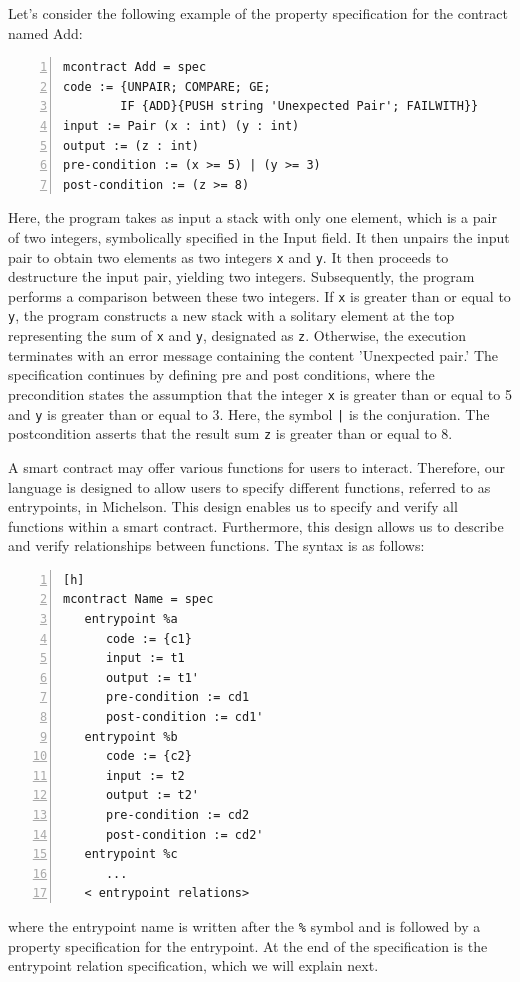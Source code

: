 \documentclass[a4paper,UKenglish,cleveref, autoref, thm-restate]{lipics-v2021}
\begin{document}
Let's consider the following example of the property specification for the contract named Add:
\begin{lstlisting}[float,captionpos=b,caption={The specification of Add contracr},label={lst:safer-contract-module},numbers=left]
mcontract Add = spec
code := {UNPAIR; COMPARE; GE; 
        IF {ADD}{PUSH string 'Unexpected Pair'; FAILWITH}}
input := Pair (x : int) (y : int)
output := (z : int)
pre-condition := (x >= 5) | (y >= 3)
post-condition := (z >= 8)
\end{lstlisting}
Here, the program takes as input a stack with only one element, which is a pair of two integers, symbolically specified in the Input field. It then unpairs the input pair to obtain two elements as two integers \lstinline/x/ and \lstinline/y/.  It then proceeds to destructure the input pair, yielding two integers. Subsequently, the program performs a comparison between these two integers. If  \lstinline/x/ is greater than or equal to \lstinline/y/, the program constructs a new stack with a solitary element at the top representing the sum of  \lstinline/x/ and \lstinline/y/, designated as \lstinline/z/. Otherwise, the execution terminates with an error message containing the content 'Unexpected pair.' The specification continues by defining pre and post conditions, where the precondition states the assumption that the integer  \lstinline/x/ is greater than or equal to 5 and \lstinline/y/ is greater than or equal to 3. Here, the symbol  \lstinline/|/ is the conjuration. The postcondition asserts that the result sum \lstinline/z/ is greater than or equal to 8. 

A smart contract may offer various functions for users to interact. Therefore, our language is designed to allow users to specify different functions, referred to as entrypoints, in Michelson. This design enables us to specify and verify all functions within a smart contract. Furthermore, this design allows us to describe and verify relationships between functions.  The syntax is as follows: 
\begin{lstlisting}[float,captionpos=b,caption={Multiple entrypoint specification syntax},label={lst:safer-contract-module},numbers=left][h]
mcontract Name = spec
   entrypoint %a 
      code := {c1}
      input := t1
      output := t1'
      pre-condition := cd1
      post-condition := cd1'
   entrypoint %b 
      code := {c2}
      input := t2
      output := t2'
      pre-condition := cd2
      post-condition := cd2'
   entrypoint %c 
      ...
   < entrypoint relations>
\end{lstlisting}
where the entrypoint name is written after the \lstinline/%/ symbol and is followed by a property specification for the entrypoint. At the end of the specification is the entrypoint relation specification, which we will explain next.
\end{document}
